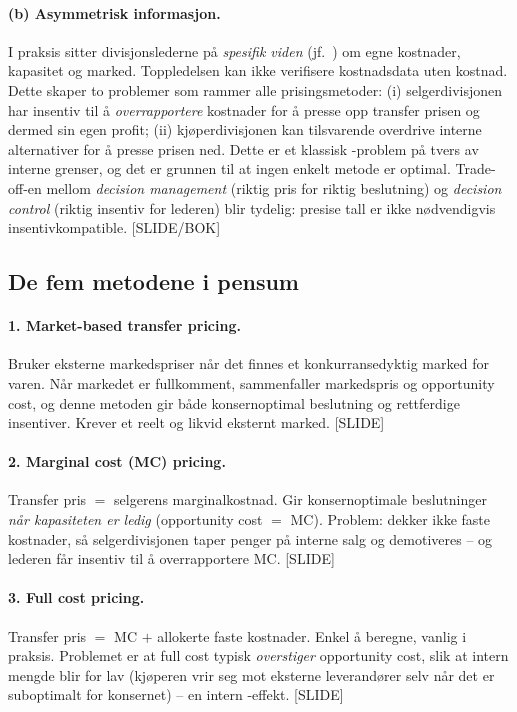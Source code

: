 \paragraph{(b) Asymmetrisk informasjon.} I praksis sitter divisjonslederne på \emph{spesifik viden} (jf.\ ) om egne kostnader, kapasitet og marked. Toppledelsen kan ikke verifisere kostnadsdata uten kostnad. Dette skaper to problemer som rammer alle prisingsmetoder: (i) selgerdivisjonen har insentiv til å \emph{overrapportere} kostnader for å presse opp transfer prisen og dermed sin egen profit; (ii) kjøperdivisjonen kan tilsvarende overdrive interne alternativer for å presse prisen ned. Dette er et klassisk -problem på tvers av interne grenser, og det er grunnen til at ingen enkelt metode er optimal. Trade-off-en mellom \emph{decision management} (riktig pris for riktig beslutning) og \emph{decision control} (riktig insentiv for lederen) blir tydelig: presise tall er ikke nødvendigvis insentivkompatible. [SLIDE/BOK]

\subsection*{De fem metodene i pensum}

\paragraph{1. Market-based transfer pricing.} Bruker eksterne markedspriser når det finnes et konkurransedyktig marked for varen. Når markedet er fullkomment, sammenfaller markedspris og opportunity cost, og denne metoden gir både konsernoptimal beslutning og rettferdige insentiver. Krever et reelt og likvid eksternt marked. [SLIDE]

\paragraph{2. Marginal cost (MC) pricing.} Transfer pris $=$ selgerens marginalkostnad. Gir konsernoptimale beslutninger \emph{når kapasiteten er ledig} (opportunity cost $=$ MC). Problem: dekker ikke faste kostnader, så selgerdivisjonen taper penger på interne salg og demotiveres -- og lederen får insentiv til å overrapportere MC. [SLIDE]

\paragraph{3. Full cost pricing.} Transfer pris $=$ MC $+$ allokerte faste kostnader. Enkel å beregne, vanlig i praksis. Problemet er at full cost typisk \emph{overstiger} opportunity cost, slik at intern mengde blir for lav (kjøperen vrir seg mot eksterne leverandører selv når det er suboptimalt for konsernet) -- en intern -effekt. [SLIDE]

